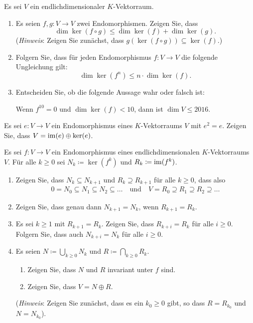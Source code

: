 \documentclass[a4paper, 10pt]{scrartcl}
\begin{document}
\begin{question}
  Es sei $V$ ein endlichdimensionaler $K$-Vektorraum.
  \begin{enumerate}[leftmargin=*]
    \item
      Es seien $f, g \colon V \to V$ zwei Endomorphismen.
      Zeigen Sie, dass
      \[
        \dim \ker(f \circ g) \leq \dim \ker(f) + \dim \ker(g).
      \]
      (\emph{Hinweis}: Zeigen Sie zunächst, dass $g(\ker(f \circ g)) \subseteq \ker(f)$.)
    \item
      Folgern Sie, dass für jeden Endomorphismus $f \colon V \to V$ die folgende Ungleichung gilt:
      \[
        \dim \ker(f^n) \leq n \cdot \dim \ker(f).
      \]
    \item
      Entscheiden Sie, ob die folgende Aussage wahr oder falsch ist:
      
      Wenn $f^{10} = 0$ und $\dim \ker(f) < 10$, dann ist $\dim V \leq 2016$.
  \end{enumerate}
\end{question}


\begin{question}
  Es sei $e \colon V \to V$ ein Endomorphismus eines $K$-Vektorraums $V$ mit $e^2 = e$.
  Zeigen Sie, dass $V = \operatorname{im}(e) \oplus \ker(e)$.
\end{question}


\begin{question}
  Es sei $f \colon V \to V$ ein Endomorphismus eines endlichdimensionalen $K$-Vektorraums $V$.
  Für alle $k \geq 0$ sei $N_k \coloneqq \ker(f^k)$ und $R_k \coloneqq \operatorname{im}(f^k)$.
  \begin{enumerate}[leftmargin=*]
    \item
      Zeigen Sie, dass $N_k \subseteq N_{k+1}$ und $R_k \supseteq R_{k+1}$ für alle $k \geq 0$, dass also
      \begin{gather*}
        0 = N_0 \subseteq N_1 \subseteq N_2 \subseteq \dotso
      \quad\text{und}\quad
        V = R_0 \supseteq R_1 \supseteq R_2 \supseteq \dotso
      \end{gather*}
    \item
      Zeigen Sie, dass genau dann $N_{k+1} = N_k$, wenn $R_{k+1} = R_k$.
    \item
      Es sei $k \geq 1$ mit $R_{k+1} = R_k$.
      Zeigen Sie, dass $R_{k+i} = R_k$ für alle $i \geq 0$.
      Folgern Sie, dass auch $N_{k+i} = N_k$ für alle $i \geq 0$.
    \item
      Es seien $N \coloneqq \bigcup_{k \geq 0} N_k$ und $R \coloneqq \bigcap_{k \geq 0} R_k$.
      \begin{enumerate}
        \item
          Zeigen Sie, dass $N$ und $R$ invariant unter $f$ sind.
        \item
          Zeigen Sie, dass $V = N \oplus R$.
      \end{enumerate}
      (\emph{Hinweis}: Zeigen Sie zunächst, dass es ein $k_0 \geq 0$ gibt, so dass $R = R_{k_0}$ und $N = N_{k_0}$).
  \end{enumerate}
\end{question}
\end{document}
